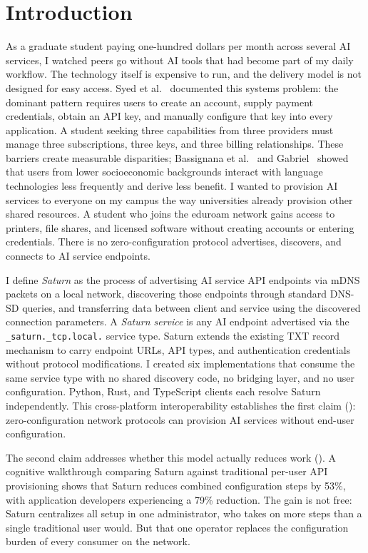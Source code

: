 \chapter{Introduction}
\label{ch:introduction}

As a graduate student paying one-hundred dollars per month across several AI services, I watched peers go without AI tools that had become part of my daily workflow. The technology itself is expensive to run, and the delivery model is not designed for easy access. Syed et al.~\cite{syed2025aiaas} documented this systems problem: the dominant pattern requires users to create an account, supply payment credentials, obtain an API key, and manually configure that key into every application. A student seeking three capabilities from three providers must manage three subscriptions, three keys, and three billing relationships. These barriers create measurable disparities; Bassignana et al.~\cite{bassignana2025aigap} and Gabriel~\cite{gabriel2024educational} showed that users from lower socioeconomic backgrounds interact with language technologies less frequently and derive less benefit. I wanted to provision AI services to everyone on my campus the way universities already provision other shared resources. A student who joins the eduroam network gains access to printers, file shares, and licensed software without creating accounts or entering credentials. There is no zero-configuration protocol advertises, discovers, and connects to AI service endpoints.

I define \emph{Saturn} as the process of advertising AI service API endpoints via mDNS packets on a local network, discovering those endpoints through standard DNS-SD queries, and transferring data between client and service using the discovered connection parameters. A \emph{Saturn service} is any AI endpoint advertised via the \texttt{\_saturn.\_tcp.\allowbreak{}local.} service type. Saturn extends the existing TXT record mechanism to carry endpoint URLs, API types, and authentication credentials without protocol modifications. I created six implementations that consume the same service type with no shared discovery code, no bridging layer, and no user configuration. Python, Rust, and TypeScript clients each resolve Saturn independently. This cross-platform interoperability establishes the first claim (): zero-configuration network protocols can provision AI services without end-user configuration.

The second claim addresses whether this model actually reduces work (). A cognitive walkthrough comparing Saturn against traditional per-user API provisioning shows that Saturn reduces combined configuration steps by 53\%, with application developers experiencing a 79\% reduction. The gain is not free: Saturn centralizes all setup in one administrator, who takes on more steps than a single traditional user would. But that one operator replaces the configuration burden of every consumer on the network. 


